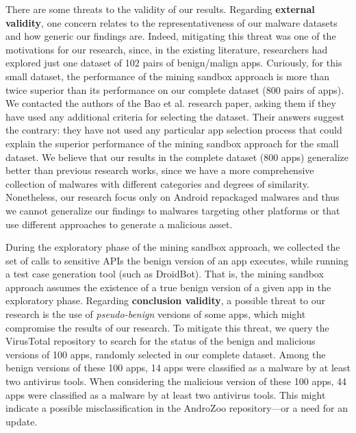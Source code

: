 There are some threats to the validity of our results.
Regarding {\bf external validity}, one concern relates to the 
representativeness of our malware datasets and how generic our findings are.
Indeed, mitigating this threat was one of the motivations for our research,
since, in the existing literature, researchers had explored just
one dataset of 102 pairs of benign/malign apps. Curiously,
for this small dataset, the performance of the
mining sandbox approach is more than twice superior
than its performance on our complete dataset (800 pairs of
apps). We contacted the authors of the Bao et al. research paper, asking them
if they have used any additional criteria for selecting the
dataset. Their answers suggest the contrary: they have not used
any particular app selection process that
could explain the superior performance of the mining
sandbox approach for the small dataset. We believe that
our results in the complete dataset (800 apps) generalize better than previous research works,
since we have a more comprehensive collection of malwares with different
categories and degrees of similarity. Nonetheless, our
research focus only on Android repackaged malwares and thus we
cannot generalize our findings to malwares targeting
other platforms or that use different approaches to
generate a malicious asset.

During the exploratory phase of the mining sandbox approach,
we collected the set of calls to sensitive APIs the benign version of
an app executes, while running a test case generation tool (such as
DroidBot). That is, the mining sandbox approach assumes the existence of a true benign
version of a given app in the exploratory phase. Regarding {\bf conclusion validity}, a
possible threat to our research is the use of \emph{pseudo-benign} versions
of some apps, which might compromise the results of our research.
To mitigate this threat, we query the VirusTotal repository to search for the
status of the benign and malicious versions of 100 apps,
randomly selected in our complete dataset. Among the benign
versions of these 100 apps, 14 apps were classified as a malware 
by at least two antivirus tools. When considering
the malicious version of these 100 apps, 44 apps were
classified as a malware by at least two antivirus tools. This might indicate
a possible misclassification in the AndroZoo repository---or a need
for an update. 

